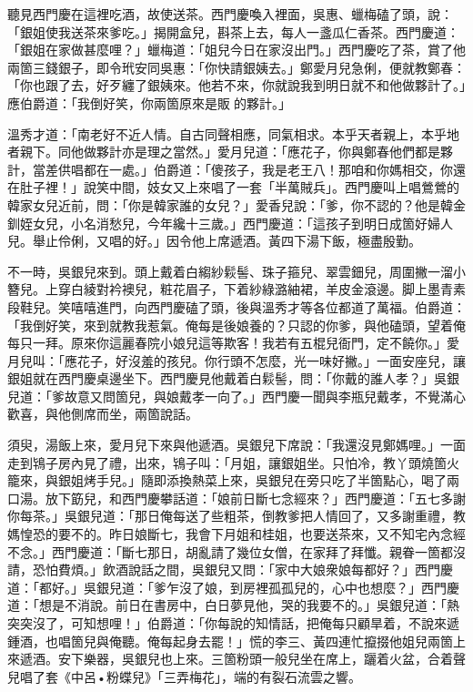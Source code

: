 聽見西門慶在這裡吃酒，故使送茶。西門慶喚入裡面，吳惠、蠟梅磕了頭，說：「銀姐使我送茶來爹吃。」揭開盒兒，斟茶上去，每人一盞瓜仁香茶。西門慶道：「銀姐在家做甚麼哩？」蠟梅道：「姐兒今日在家沒出門。」西門慶吃了茶，賞了他兩箇三錢銀子，即令玳安同吳惠：「你快請銀姨去。」鄭愛月兒急俐，便就教鄭春：「你也跟了去，好歹纏了銀姨來。他若不來，你就說我到明日就不和他做夥計了。」應伯爵道：「我倒好笑，你兩箇原來是販𣬼的夥計。」

{}溫秀才道：「南老好不近人情。自古同聲相應，同氣相求。{}本乎天者親上，本乎地者親下。{}同他做夥計亦是理之當然。」愛月兒道：「應花子，你與鄭春他們都是夥計，當差供唱都在一處。」伯爵道：「傻孩子，我是老王八！那咱和你媽相交，你還在肚子裡！」說笑中間，妓女又上來唱了一套「半萬賊兵」。西門慶叫上唱鶯鶯的韓家女兒近前，問：「你是韓家誰的女兒？」愛香兒說：「爹，你不認的？他是韓金釧姪女兒，小名消愁兒，今年纔十三歲。」西門慶道：「這孩子到明日成箇好婦人兒。舉止伶俐，又唱的好。」因令他上席遞酒。黃四下湯下飯，極盡殷勤。

不一時，吳銀兒來到。頭上戴着白縐紗鬏髻、珠子箍兒、翠雲鈿兒，周圍撇一溜小簪兒。上穿白綾對衿襖兒，粧花眉子，下着紗綠潞紬裙，羊皮金滾邊。脚上墨青素段鞋兒。{}笑嘻嘻進門，向西門慶磕了頭，後與溫秀才等各位都道了萬福。伯爵道：「我倒好笑，來到就教我惹氣。俺每是後娘養的？只認的你爹，與他磕頭，望着俺每只一拜。原來你這麗春院小娘兒這等欺客！我若有五棍兒衙門，定不饒你。」{}愛月兒叫：「應花子，好沒羞的孩兒。你行頭不怎麼，光一味好撇。」一面安座兒，讓銀姐就在西門慶桌邊坐下。西門慶見他戴着白鬏髻，問：「你戴的誰人孝？」吳銀兒道：「爹故意又問箇兒，與娘戴孝一向了。」西門慶一聞與李瓶兒戴孝，不覺滿心歡喜，與他側席而坐，兩箇說話。

須臾，湯飯上來，愛月兒下來與他遞酒。吳銀兒下席說：「我還沒見鄭媽哩。」一面走到鴇子房內見了禮，出來，鴇子叫：「月姐，讓銀姐坐。只怕冷，教丫頭燒箇火籠來，與銀姐烤手兒。」隨即添換熱菜上來，吳銀兒在旁只吃了半箇點心，喝了兩口湯。放下筯兒，和西門慶攀話道：「娘前日斷七念經來？」西門慶道：「五七多謝你每茶。」吳銀兒道：「那日俺每送了些粗茶，倒教爹把人情回了，又多謝重禮，教媽惶恐的要不的。昨日娘斷七，我會下月姐和桂姐，也要送茶來，又不知宅內念經不念。」西門慶道：「斷七那日，胡亂請了幾位女僧，在家拜了拜懺。親眷一箇都沒請，恐怕費煩。」飲酒說話之間，吳銀兒又問：「家中大娘衆娘每都好？」西門慶道：「都好。」吳銀兒道：「爹乍沒了娘，到房裡孤孤兒的，心中也想麼？{}」西門慶道：「想是不消說。前日在書房中，白日夢見他，哭的我要不的。」吳銀兒道：「熱突突沒了，可知想哩！」伯爵道：「你每說的知情話，把俺每只顧旱着，不說來遞鍾酒，也唱箇兒與俺聽。俺每起身去罷！」慌的李三、黃四連忙攛掇他姐兒兩箇上來遞酒。安下樂器，吳銀兒也上來。三箇粉頭一般兒坐在席上，躧着火盆，合着聲兒唱了套《中呂•粉蝶兒》「三弄梅花」，端的有裂石流雲之響。


